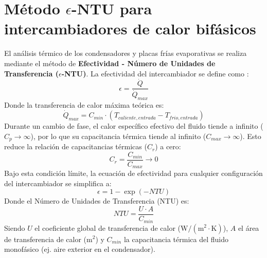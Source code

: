 \section{M\'etodo \texorpdfstring{$\epsilon$}{epsilon}-NTU para intercambiadores de calor bif\'asicos}\label{sec:metodo_ntu}
El an\'alisis t\'ermico de los condensadores y placas fr\'ias evaporativas se realiza mediante el m\'etodo de \textbf{Efectividad - N\'umero de Unidades de Transferencia ($\epsilon$-NTU)}. La efectividad del intercambiador se define como \cite{incropera2007}:
\begin{equation}\label{eq:efectividad_ntu}
\epsilon = \frac{\dot{Q}}{\dot{Q}_{max}}
\end{equation}
Donde la transferencia de calor m\'axima te\'orica es:
\begin{equation}
\dot{Q}_{max} = C_{min} \cdot (T_{caliente, entrada} - T_{frio, entrada})
\end{equation}
Durante un cambio de fase, el calor espec\'ifico efectivo del fluido tiende a infinito ($C_p \to \infty$), por lo que su capacitancia t\'ermica tiende al infinito ($C_{max} \to \infty$). Esto reduce la relaci\'on de capacitancias t\'ermicas ($C_r$) a cero:
\begin{equation}
C_r = \frac{C_{min}}{C_{max}} \to 0
\end{equation}
Bajo esta condici\'on l\'imite, la ecuaci\'on de efectividad para cualquier configuraci\'on del intercambiador se simplifica a:
\begin{equation}\label{eq:efectividad_cambio_fase}
\epsilon = 1 - \exp(-NTU)
\end{equation}
Donde el N\'umero de Unidades de Transferencia (NTU) es:
\begin{equation}
NTU = \frac{U \cdot A}{C_{min}}
\end{equation}
Siendo $U$ el coeficiente global de transferencia de calor ($\text{W}/(\text{m}^2\cdot\text{K})$), $A$ el \'area de transferencia de calor ($\text{m}^2$) y $C_{min}$ la capacitancia t\'ermica del fluido monof\'asico (ej. aire exterior en el condensador).

